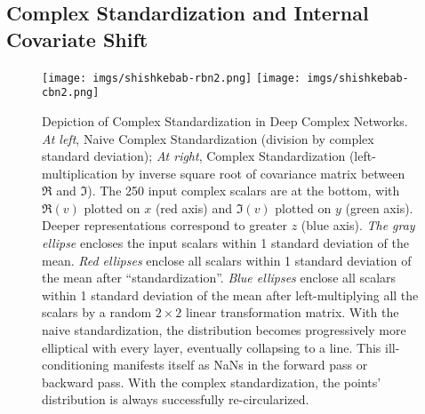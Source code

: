 \documentclass{article}
\begin{document}
\newpage
\subsection{Complex Standardization and Internal Covariate Shift}\label{covariateshift}
\begin{figure}[h]
\centering
\texttt{[image: imgs/shishkebab-rbn2.png]}
\texttt{[image: imgs/shishkebab-cbn2.png]}
	\caption{Depiction of Complex Standardization in Deep Complex Networks. \textit{At left}, Naive Complex Standardization (division by complex standard deviation); \textit{At right}, Complex Standardization (left-multiplication by inverse square root of covariance matrix between $\Re$ and $\Im$). The 250 input complex scalars are at the bottom, with $\Re(v)$ plotted on $x$ (red axis) and $\Im(v)$ plotted on $y$ (green axis). Deeper representations correspond to greater $z$ (blue axis). \textit{The gray ellipse} encloses the input scalars within 1 standard deviation of the mean. \textit{Red ellipses} enclose all scalars within 1 standard deviation of the mean after ``standardization''. \textit{Blue ellipses} enclose all scalars within 1 standard deviation of the mean after left-multiplying all the scalars by a random $2 \times 2$ linear transformation matrix. With the naive standardization, the distribution becomes progressively more elliptical with every layer, eventually collapsing to a line. This ill-conditioning manifests itself as NaNs in the forward pass or backward pass. With the complex standardization, the points' distribution is always successfully re-circularized.}
\end{figure}

\newpage
\end{document}
